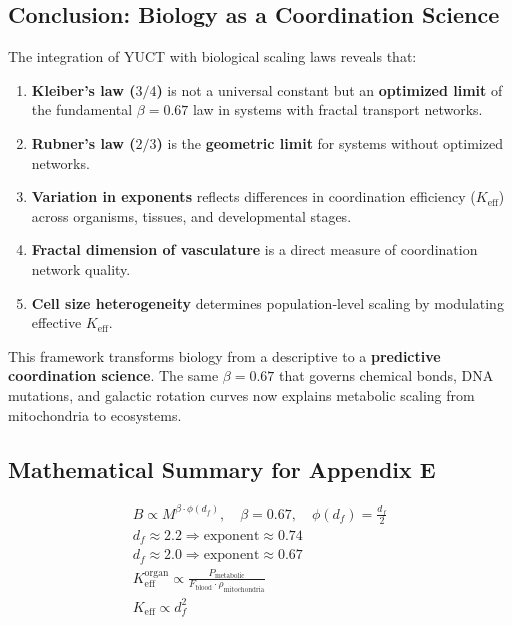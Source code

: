 \documentclass[12pt]{article}
\newcommand{\Keff}{K_{\mathrm{eff}}}
\begin{document}
	\subsection{Conclusion: Biology as a Coordination Science}
	
	The integration of YUCT with biological scaling laws reveals that:
	
	\begin{enumerate}
		\item \textbf{Kleiber's law (\(3/4\))} is not a universal constant but an \textbf{optimized limit} of the fundamental \(\beta = 0.67\) law in systems with fractal transport networks.
		\item \textbf{Rubner's law (\(2/3\))} is the \textbf{geometric limit} for systems without optimized networks.
		\item \textbf{Variation in exponents} reflects differences in coordination efficiency (\(\Keff\)) across organisms, tissues, and developmental stages.
		\item \textbf{Fractal dimension of vasculature} is a direct measure of coordination network quality.
		\item \textbf{Cell size heterogeneity} determines population‑level scaling by modulating effective \(\Keff\).
	\end{enumerate}
	
	This framework transforms biology from a descriptive to a \textbf{predictive coordination science}. The same \(\beta = 0.67\) that governs chemical bonds, DNA mutations, and galactic rotation curves now explains metabolic scaling from mitochondria to ecosystems.
	
	\subsection{Mathematical Summary for Appendix E}
	
	\begin{align}
		\boxed{B \propto M^{\beta \cdot \phi(d_f)},\quad \beta = 0.67,\quad \phi(d_f) = \frac{d_f}{2}} \\
		\boxed{d_f \approx 2.2 \Rightarrow \text{exponent} \approx 0.74} \\
		\boxed{d_f \approx 2.0 \Rightarrow \text{exponent} \approx 0.67} \\
		\boxed{\Keff^{\text{organ}} \propto \frac{P_{\text{metabolic}}}{F_{\text{blood}} \cdot \rho_{\text{mitochondria}}}} \\
		\boxed{\Keff \propto d_f^{2}}
	\end{align}
	
\end{document}
